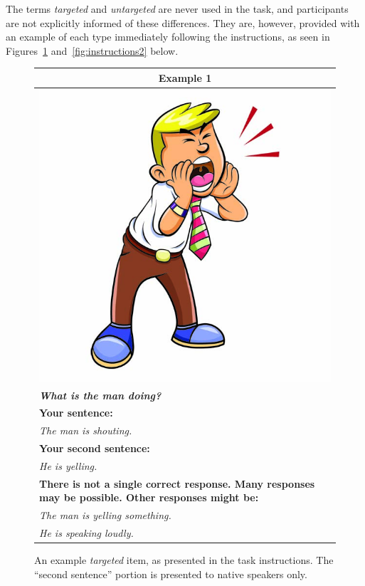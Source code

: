 \documentclass[12pt]{article}
\begin{document}
The terms \textit{targeted} and \textit{untargeted} are never used in the task, and participants are not explicitly informed of these differences. They are, however, provided with an example of each type immediately following the instructions, as seen in Figures~\ref{fig:instructions1} and~\ref{fig:instructions2} below.

\begin{figure}[!htb]
\begin{center}
\begin{tabular}{|p{}|}
\hline
\multicolumn{1}{|c|}{\textbf{Example 1}}\\
\hline
\multicolumn{1}{|c|}{\includegraphics[width=0.4\columnwidth,trim=0 0 0 -3]{figures/ex02.jpg}}\\
\hline
\textbf{\textit{What is the man doing?}}\\
\hline
\textbf{Your sentence:} \\
\textit{The man is shouting.}\\
\hline
\textbf{Your second sentence:} \\
\textit{He is yelling.} \\
\hline
\textbf{There is not a single correct response. Many responses may be possible. Other responses might be:} \\
\textit{The man is yelling something.} \\
\textit{He is speaking loudly.} \\
\hline
\end{tabular}
\end{center}
\caption{An example \textit{targeted} item, as presented in the task instructions. The ``second sentence'' portion is presented to native speakers only.}
\label{fig:instructions1}
\end{figure}
\end{document}
